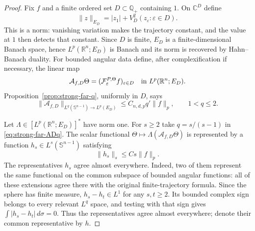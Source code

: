 \documentclass[11pt]{article}
\numberwithin{equation}{section}
\theoremstyle{remark}
\theoremstyle{definition}
\newcommand{\R}{\mathbb R}
\newcommand{\Sph}{\mathbb S}
\newcommand{\cF}{\mathcal F}
\newcommand{\norm}[1]{\lVert #1\rVert}
\begin{document}
\begin{proof}
Fix $f$ and a finite ordered set $D\subset\mathbb Q_+$ containing $1$.
On $\mathbb C^D$ define
\begin{equation}\label{eq:strong-far-ED}
 \norm z_{E_D}=|z_1|+V_D^2(z_\varepsilon:\varepsilon\in D).
\end{equation}
This is a norm: vanishing variation makes the trajectory constant, and
the value at $1$ then detects that constant.  Since $D$ is finite,
$E_D$ is a finite-dimensional Banach space, hence
$L^p(\R^n;E_D)$ is Banach and its norm is recovered by Hahn--Banach
duality.  For bounded angular data
define, after complexification if necessary, the linear map
\[
 \mathcal A_{f,D}\Theta
 =(\cF^{P,\Theta}_\varepsilon f)_{\varepsilon\in D}
 \quad\hbox{in }L^p(\R^n;E_D).
\]
Proposition~\ref{prop:strong-far-q}, uniformly in $D$, says
\begin{equation}\label{eq:strong-far-ADq}
 \norm{\mathcal A_{f,D}}_{L^q(\Sph^{n-1})\to L^p(E_D)}
 \leq C_{n,d,p}q'\norm f_p,
 \qquad1<q\leq2.
\end{equation}

Let $\Lambda\in[L^p(\R^n;E_D)]^*$ have norm one.  For $s\geq2$ take
$q=s/(s-1)$ in \eqref{eq:strong-far-ADq}.  The scalar functional
$\Theta\mapsto\Lambda(\mathcal A_{f,D}\Theta)$ is represented by a
function $h_s\in L^s(\Sph^{n-1})$ satisfying
\begin{equation}\label{eq:strong-far-hs}
 \norm{h_s}_s\leq Cs\norm f_p.
\end{equation}
The representatives $h_s$ agree almost everywhere.  Indeed, two of them
represent the same functional on the common subspace of bounded angular
functions: all of these extensions agree there with the original
finite-trajectory formula.  Since the sphere has finite measure,
$h_s-h_t\in L^1$ for any $s,t\ge2$.  Its bounded complex sign belongs to
every relevant $L^q$ space, and testing with that sign gives
$\int|h_s-h_t|\,d\sigma=0$.  Thus the representatives agree almost
everywhere; denote their common representative by $h$.


\end{proof}
\end{document}
